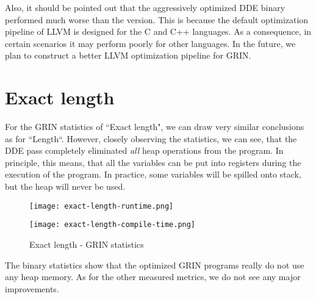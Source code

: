 \documentclass[main.tex]{subfiles}
\begin{document}
	Also, it should be pointed out that the aggressively optimized DDE binary performed much worse than the  version. This is because the default optimization pipeline of LLVM is designed for the C and C++ languages. As a consequence, in certain scenarios it may perform poorly for other languages. In the future, we plan to construct a better LLVM optimization pipeline for GRIN.

	\section{Exact length}
	
	For the GRIN statistics of ``Exact length", we can draw very similar conclusions as for ``Length``. However, closely observing the statistics, we can see, that the DDE pass completely eliminated \emph{all} heap operations from the program. In principle, this means, that all the variables can be put into registers during the execution of the program. In practice, some variables will be spilled onto stack, but the heap will never be used.

	\begin{figure}[H]
		\hspace{-0.5cm}
		\renewcommand{\figurename}{Diagram}
		\caption{Exact length - GRIN statistics}
		\label{diagram:exact-length-stats}
		\addtocounter{figure}{-1}
		\begin{minipage}{0.5\textwidth}
			\label{diagram:exact-length-stats-rt}
			\texttt{[image: exact-length-runtime.png]}
		\end{minipage}
		\begin{minipage}{0.5\textwidth}
			\label{diagram:exact-length-stats-ct}
			\texttt{[image: exact-length-compile-time.png]}
		\end{minipage}
	\end{figure}

	The binary statistics show that the optimized GRIN programs really do not use any heap memory. As for the other measured metrics, we do not see any major improvements.
\end{document}
